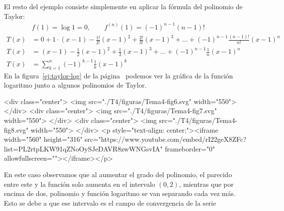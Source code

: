 \begin{ejemplo}
El resto del ejemplo consiste simplemente en aplicar la fórmula del polinomio de Taylor:
%
\begin{align*}
&f(1)=\log 1=0,\qquad f^{(n)}(1)=(-1)^{n-1}(n-1)!\\
T(x)&=0+1\cdot(x-1)-\frac{1!}{2!}(x-1)^2+\frac{2!}{3!}(x-1)^3+\dots+(-1)^{n-1}\frac{(n-1)!}{n!}(x-1)^n\\
T(x)&=(x-1)-\frac12(x-1)^2+\frac13(x-1)^3+\dots+(-1)^{n-1}\frac1n(x-1)^n\\
T(x)&=\displaystyle\sum_{k=1}^n (-1)^{k-1}\frac1k(x-1)^k
\end{align*}
En la figura~\ref{ej:taylor-log} de la página~\pageref{ej:taylor-log} podemos ver la gráfica de la función logaritmo junto a algunos polinomios de Taylor.
\begin{rawhtml}
<div class="center">
<img src="./T4/figuras/Tema4-fig6.svg" width="550">
</div>
<div class="center">
<img src="./T4/figuras/Tema4-fig7.svg" width="550">
</div>
<div class="center">
<img src="./T4/figuras/Tema4-fig8.svg" width="550">
</div>
<p style="text-align: center;"><iframe width="560" height="316" src="https://www.youtube.com/embed/rI22geX8ZFc?list=PL2rtpLKW91qZNoOySJeDAVR8zwWNGsvIA" frameborder="0" allowfullscreen=""></iframe></p>
\end{rawhtml}

En este caso observamos que al aumentar el grado del polinomio, el parecido entre este y la función solo aumenta en el intervalo $(0,2)$, mientras que por encima de dos, polinomio y función logaritmo se van separando cada vez más.
Esto se debe a que ese intervalo es el campo de convergencia de la serie\fej
\end{ejemplo}


